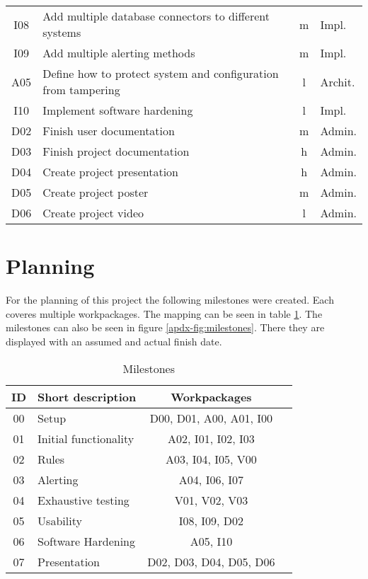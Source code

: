 \begin{table}[h!]
\begin{center}
\begin{tabular}{c|l|c|l}
		I08 & Add multiple database connectors to different systems & m & Impl. \\
		I09 & Add multiple alerting methods & m & Impl. \\
		A05 & Define how to protect system and configuration from tampering & l & Archit. \\
		I10 & Implement software hardening & l & Impl. \\
		D02 & Finish user documentation & m & Admin. \\
		D03 & Finish project documentation & h & Admin. \\ 
		D04 & Create project presentation & h & Admin. \\
		D05 & Create project poster & m & Admin. \\
		D06 & Create project video & l & Admin. \\
    \end{tabular}
  \end{center}
\end{table}

\section{Planning}

For the planning of this project the following milestones were created. Each coveres multiple workpackages. The mapping can be seen in table \ref{tab:milestones}. The milestones can also be seen in figure \ref{apdx-fig:milestones}. There they are displayed with an assumed and actual finish date.



\begin{table}[h!]
  \begin{center}
    \caption{Milestones}
    \label{tab:milestones}
    \begin{tabular}{c|l|c|l}
      \textbf{ID} & \textbf{Short description} & \textbf{Workpackages} \\
      \hline
			00 & Setup & D00, D01, A00, A01, I00 \\
			01 & Initial functionality & A02, I01, I02, I03 \\
			02 & Rules & A03, I04, I05, V00 \\
			03 & Alerting & A04, I06, I07 \\
			04 & Exhaustive testing & V01, V02, V03 \\
			05 & Usability & I08, I09, D02 \\
			06 & Software Hardening & A05, I10 \\
			07 & Presentation & D02, D03, D04, D05, D06 \\
    \end{tabular}
  \end{center}
\end{table}



